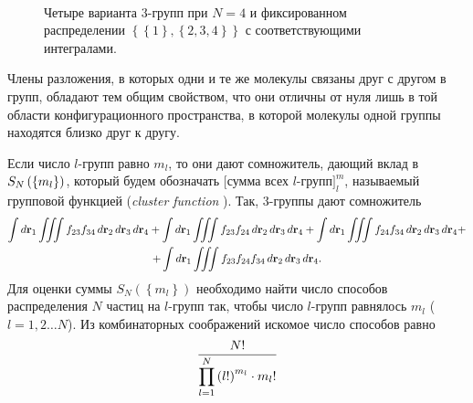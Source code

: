 \begin{figure}[h]
\begin{minipage}{0.33\linewidth}
		\caption*{$\displaystyle \int d \mathbf{r}_1 \iiint f_{24} f_{34} \, d \mathbf{r}_2 \, d \mathbf{r}_3 \, d \mathbf{r}_4$}
	\end{minipage} \\
	\begin{center}
	\begin{minipage}{0.33\linewidth}
		\caption*{$\displaystyle \int d \mathbf{r}_1 \iiint f_{23} f_{24} f_{34} \, d \mathbf{r}_2 \, d \mathbf{r}_3 \, d \mathbf{r}_4$}
	\end{minipage}
\end{center}
\caption{Четыре варианта $3$-групп при $N = 4$ и фиксированном распределении $ \left\{ \left\{ 1 \right\}, \left\{ 2, 3, 4 \right\} \right\}$ с соответствующими интегралами.}
\label{pic:graphs}
\end{figure}

Члены разложения, в которых одни и те же молекулы связаны друг с другом в групп, обладают тем общим свойством, что они отличны от нуля лишь в той области конфигурационного пространства, в которой молекулы одной группы находятся близко друг к другу.

Если число $l$-групп равно $m_l$, то они дают сомножитель, дающий вклад в $S_N \left( \left\{ m_l \right\} \right)$, который будем обозначать $\bigg[ \text{сумма всех $l$-групп} \bigg]^m_l$, называемый групповой функцией (\textit{cluster function} \cite{mayer}). Так, 3-группы дают сомножитель
\vverh
\begin{gather}
\int d \mathbf{r}_1 \iiint f_{23} f_{34} \, d \mathbf{r}_2 \, d \mathbf{r}_3 \, d \mathbf{r}_4 + \int d \mathbf{r}_1 \iiint f_{23} f_{24} \, d \mathbf{r}_2 \, d \mathbf{r}_3 \, d \mathbf{r}_4 + \int d \mathbf{r}_1 \iiint f_{24} f_{34} \, d \mathbf{r}_2 \, d \mathbf{r}_3 \, d \mathbf{r}_4 + \notag \\ + \int d \mathbf{r}_1 \iiint f_{23} f_{24} f_{34} \, d \mathbf{r}_2 \, d \mathbf{r}_3 \, d \mathbf{r}_4. \notag
\end{gather}
Для оценки суммы $S_N \left( \left\{ m_l \right\} \right)$ необходимо найти число способов распределения $N$ частиц на $l$-групп так, чтобы число $l$-групп равнялось $m_l$ ($l = 1, 2 \dots N$). Из комбинаторных соображений искомое число способов равно
\vverh
\begin{gather}
	\dfrac{N!}{\displaystyle\prod_{l=1}^{N} \left( l! \right)^{m_l} \cdot m_l !} \notag 
\end{gather}

